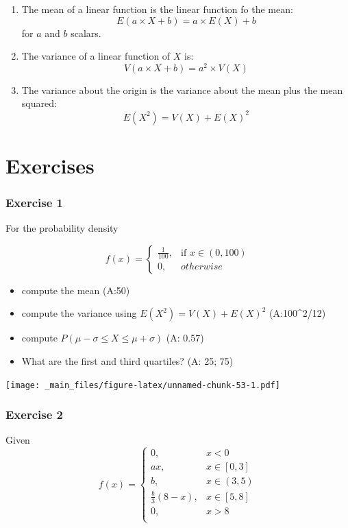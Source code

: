 \documentclass[
]{book}
\providecommand{\tightlist}{%
  \setlength{\itemsep}{0pt}\setlength{\parskip}{0pt}}
\begin{document}
\begin{enumerate}
\def\labelenumi{\arabic{enumi})}
\item
  The mean of a linear function is the linear function fo the mean: \[E(a\times X +b)= a\times E(X) +b\] for \(a\) and \(b\) scalars.
\item
  The variance of a linear function of \(X\) is:\[V(a\times X +b)= a^2\times V(X)\]
\item
  The variance about the origin is the variance about the mean plus the mean squared: \[E(X^2)=V(X)+E(X)^2\]
\end{enumerate}

\hypertarget{exercises-4}{%
\section{Exercises}\label{exercises-4}}

\hypertarget{exercise-1-3}{%
\subsubsection{Exercise 1}\label{exercise-1-3}}

For the probability density

\[
    f(x)= 
\begin{cases}
    \frac{1}{100},& \text{if } x\in (0,100)\\
    0,& otherwise 
\end{cases}
\]

\begin{itemize}
\tightlist
\item
  compute the mean (A:50)
\item
  compute the variance using \(E(X^2)=V(X)+E(X)^2\) (A:100\^{}2/12)
\item
  compute \(P(\mu-\sigma\leq X \leq \mu+\sigma)\) (A: 0.57)
\item
  What are the first and third quartiles? (A: 25; 75)
\end{itemize}

\texttt{[image: \_main\_files/figure-latex/unnamed-chunk-53-1.pdf]}

\hypertarget{exercise-2-3}{%
\subsubsection{Exercise 2}\label{exercise-2-3}}

Given
\[
    f(x)= 
\begin{cases}
0, & x < 0 \\
ax, & x \in [0,3] \\
b, & x \in (3,5) \\
\frac{b}{3}(8-x),& x \in [5,8]\\
0, & x > 8 \\
\end{cases}
\]
\end{document}
